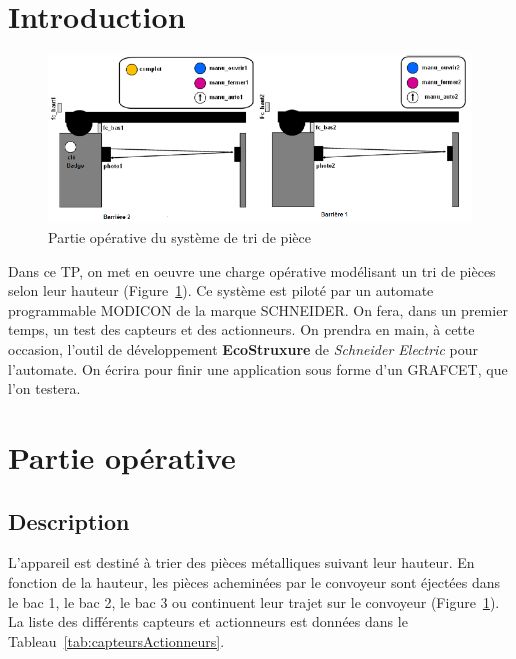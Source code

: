 \documentclass[11pt, multicol]{article}
\begin{document}
\UPSTIbuildPage
{}

\tableofcontents


\section{Introduction}
\begin{figure}[ht]
	\centering
	\includegraphics[width=.63\linewidth]{images/schemaSysteme}
	\caption{Partie opérative du système de tri de pièce}
	\label{fig:schemaPartieOperative}
\end{figure}
Dans ce TP, on met en oeuvre une charge opérative modélisant un tri de pièces selon leur hauteur (Figure~\ref{fig:schemaPartieOperative}). Ce système est piloté par un automate programmable MODICON de la marque SCHNEIDER. On fera, dans un premier temps, un test des capteurs et des actionneurs.
On prendra en main, à cette occasion, l’outil de développement \textbf{EcoStruxure} de \textit{Schneider Electric} pour l’automate. On écrira pour finir une application sous forme d’un GRAFCET, que l’on testera.

\section{Partie opérative}
\subsection{Description}
L’appareil est destiné à trier des pièces métalliques suivant leur hauteur. En fonction de la hauteur, les pièces acheminées par le convoyeur sont éjectées dans le bac 1, le bac 2, le bac 3 ou continuent leur trajet sur le convoyeur (Figure~\ref{fig:schemaPartieOperative}). La liste des différents capteurs et actionneurs est données dans le Tableau~\ref{tab:capteursActionneurs}.
\end{document}
